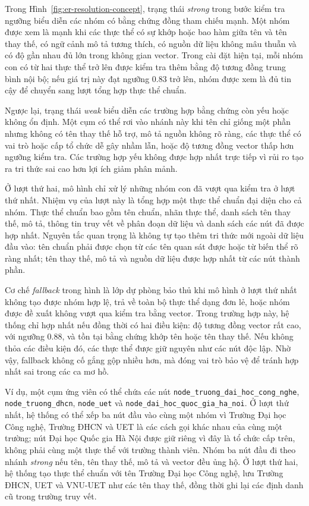 Trong Hình~\ref{fig:er-resolution-concept}, trạng thái \textit{strong} trong bước kiểm tra ngưỡng biểu diễn các nhóm có bằng chứng đồng tham chiếu mạnh. Một nhóm được xem là mạnh khi các thực thể có sự khớp hoặc bao hàm giữa tên và tên thay thế, có ngữ cảnh mô tả tương thích, có nguồn dữ liệu không mâu thuẫn và có độ gần nhau đủ lớn trong không gian vector. Trong cài đặt hiện tại, mỗi nhóm con có từ hai thực thể trở lên được kiểm tra thêm bằng độ tương đồng trung bình nội bộ; nếu giá trị này đạt ngưỡng 0.83 trở lên, nhóm được xem là đủ tin cậy để chuyển sang lượt tổng hợp thực thể chuẩn.

Ngược lại, trạng thái \textit{weak} biểu diễn các trường hợp bằng chứng còn yếu hoặc không ổn định. Một cụm có thể rơi vào nhánh này khi tên chỉ giống một phần nhưng không có tên thay thế hỗ trợ, mô tả nguồn không rõ ràng, các thực thể có vai trò hoặc cấp tổ chức dễ gây nhầm lẫn, hoặc độ tương đồng vector thấp hơn ngưỡng kiểm tra. Các trường hợp yếu không được hợp nhất trực tiếp vì rủi ro tạo ra tri thức sai cao hơn lợi ích giảm phân mảnh.

Ở lượt thứ hai, mô hình chỉ xử lý những nhóm con đã vượt qua kiểm tra ở lượt thứ nhất. Nhiệm vụ của lượt này là tổng hợp một thực thể chuẩn đại diện cho cả nhóm. Thực thể chuẩn bao gồm tên chuẩn, nhãn thực thể, danh sách tên thay thế, mô tả, thông tin truy vết về phân đoạn dữ liệu và danh sách các nút đã được hợp nhất. Nguyên tắc quan trọng là không tự tạo thêm tri thức mới ngoài dữ liệu đầu vào: tên chuẩn phải được chọn từ các tên quan sát được hoặc từ biến thể rõ ràng nhất; tên thay thế, mô tả và nguồn dữ liệu được hợp nhất từ các nút thành phần.

Cơ chế \textit{fallback} trong hình là lớp dự phòng bảo thủ khi mô hình ở lượt thứ nhất không tạo được nhóm hợp lệ, trả về toàn bộ thực thể dạng đơn lẻ, hoặc nhóm được đề xuất không vượt qua kiểm tra bằng vector. Trong trường hợp này, hệ thống chỉ hợp nhất nếu đồng thời có hai điều kiện: độ tương đồng vector rất cao, với ngưỡng 0.88, và tồn tại bằng chứng khớp tên hoặc tên thay thế. Nếu không thỏa các điều kiện đó, các thực thể được giữ nguyên như các nút độc lập. Nhờ vậy, fallback không cố gắng gộp nhiều hơn, mà đóng vai trò bảo vệ để tránh hợp nhất sai trong các ca mơ hồ.

Ví dụ, một cụm ứng viên có thể chứa các nút \texttt{node\_truong\_dai\_hoc\_cong\_nghe}, \texttt{node\_truong\_dhcn}, \texttt{node\_uet} và \texttt{node\_dai\_hoc\_quoc\_gia\_ha\_noi}. Ở lượt thứ nhất, hệ thống có thể xếp ba nút đầu vào cùng một nhóm vì Trường Đại học Công nghệ, Trường ĐHCN và UET là các cách gọi khác nhau của cùng một trường; nút Đại học Quốc gia Hà Nội được giữ riêng vì đây là tổ chức cấp trên, không phải cùng một thực thể với trường thành viên. Nhóm ba nút đầu đi theo nhánh \textit{strong} nếu tên, tên thay thế, mô tả và vector đều ủng hộ. Ở lượt thứ hai, hệ thống tạo thực thể chuẩn với tên Trường Đại học Công nghệ, lưu Trường ĐHCN, UET và VNU-UET như các tên thay thế, đồng thời ghi lại các định danh cũ trong trường truy vết.

